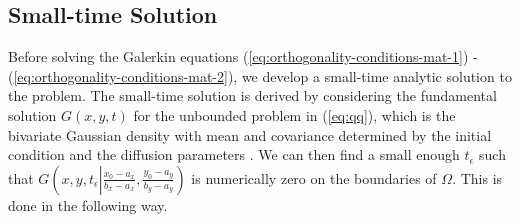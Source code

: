 \documentclass[10pt]{article}
\begin{document}
\subsection{Small-time Solution}
Before solving the Galerkin equations
(\ref{eq:orthogonality-conditions-mat-1}) -
(\ref{eq:orthogonality-conditions-mat-2}), we develop a small-time
analytic solution to the problem. The small-time solution is derived
by considering the fundamental solution $G(x,y,t)$ for the unbounded
problem in (\ref{eq:qq}), which is the bivariate Gaussian density with
mean and covariance determined by the initial condition and the
diffusion parameters \citep{stakgold2011green}. We can then find a
small enough $t_\epsilon$ such that
$G\left(x,y, t_\epsilon \left| \frac{x_0-a_x}{b_x - a_x},
    \frac{y_0-a_y}{b_y - a_y} \right.\right)$ is numerically zero on
the boundaries of $\Omega$. This is done in the following way.
\end{document}
